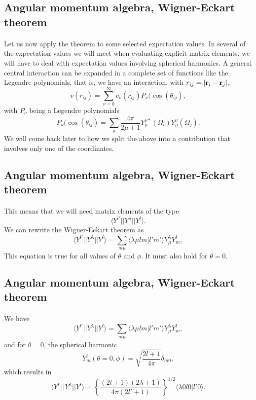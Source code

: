 \documentclass[%
twoside,                 %
final,                   %
10pt]{article}
\begin{document}
\subsection{Angular momentum algebra, Wigner-Eckart theorem}

\paragraph{}
Let us now apply the theorem to some selected expectation values.
In several of the expectation values we will meet when evaluating explicit matrix elements, we will have to deal with expectation values involving spherical harmonics. A general central interaction can be expanded in a complete set of functions like the Legendre polynomials, that is, we have an interaction, with $r_{ij}=|{\bf r}_i-{\bf r}_j|$,
\[
v(r_{ij})=\sum_{\nu=0}^{\infty}v_{\nu}(r_{ij})P_{\nu}(\cos{(\theta_{ij})},
\]
with $P_{\nu}$ being a Legendre polynomials
\[
P_{\nu}(\cos{(\theta_{ij})}=\sum_{\mu}\frac{4\pi}{2\mu+1}Y_{\mu}^{\nu *}(\Omega_{i})Y_{\mu}^{\nu}(\Omega_{j}).
\]
We will come back later to how we split the above into a contribution that involves only one of the coordinates.


\subsection{Angular momentum algebra, Wigner-Eckart theorem}

\paragraph{}
This means that we will need matrix elements of the type
\[
\langle Y^{l'}||Y^{\lambda}|| Y^{l}\rangle.
\]
We can rewrite the Wigner-Eckart theorem as 
\[
\langle Y^{l'}||Y^{\lambda}|| Y^{l}\rangle=\sum_{m\mu}\langle \lambda\mu lm|l'm'\rangle Y^{\lambda}_{\mu}Y^l_m,
\]
This equation is true for all values of $\theta$ and $\phi$. It must also hold for $\theta=0$.


\subsection{Angular momentum algebra, Wigner-Eckart theorem}

\paragraph{}
We have 
\[
\langle Y^{l'}||Y^{\lambda}|| Y^{l}\rangle=\sum_{m\mu}\langle \lambda\mu lm|l'm'\rangle Y^{\lambda}_{\mu}Y^l_m,
\]
and for $\theta=0$, the spherical harmonic
\[
Y_m^l(\theta=0,\phi)=\sqrt{\frac{2l+1}{4\pi}}\delta_{m0}, 
\]
which results in 
\[
\langle Y^{l'}||Y^{\lambda}|| Y^{l}\rangle=\left\{\frac{(2l+1)(2\lambda+1)}{4\pi(2l'+1)}\right\}^{1/2}\langle \lambda0 l0|l'0\rangle.
\]
\end{document}
